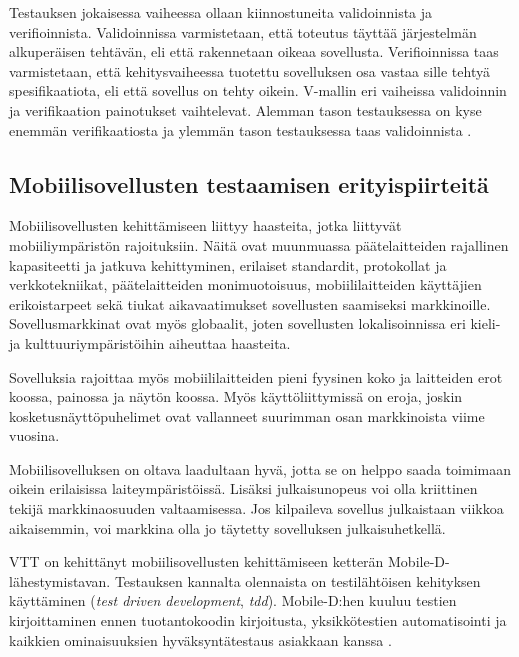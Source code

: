 Testauksen jokaisessa vaiheessa ollaan kiinnostuneita validoinnista ja verifioinnista. Validoinnissa varmistetaan, että toteutus täyttää järjestelmän alkuperäisen tehtävän, eli että rakennetaan oikeaa sovellusta. Verifioinnissa taas varmistetaan, että kehitysvaiheessa tuotettu sovelluksen osa vastaa sille tehtyä spesifikaatiota, eli että sovellus on tehty oikein. V-mallin eri vaiheissa validoinnin ja verifikaation painotukset vaihtelevat. Alemman tason testauksessa on kyse enemmän verifikaatiosta ja ylemmän tason testauksessa taas validoinnista \cite[41-42]{testing_foundations}.

\subsection{Mobiilisovellusten testaamisen erityispiirteitä}

Mobiilisovellusten kehittämiseen liittyy haasteita, jotka liittyvät mobiiliympäristön rajoituksiin. Näitä ovat muunmuassa päätelaitteiden rajallinen kapasiteetti ja jatkuva kehittyminen, erilaiset standardit, protokollat ja verkkotekniikat, päätelaitteiden monimuotoisuus, mobiililaitteiden käyttäjien erikoistarpeet sekä tiukat aikavaatimukset sovellusten saamiseksi markkinoille. Sovellusmarkkinat ovat myös globaalit, joten sovellusten lokalisoinnissa eri kieli- ja kulttuuriympäristöihin aiheuttaa haasteita.

Sovelluksia rajoittaa myös mobiililaitteiden pieni fyysinen koko ja laitteiden erot koossa, painossa ja näytön koossa. Myös käyttöliittymissä on eroja, joskin kosketusnäyttöpuhelimet ovat vallanneet suurimman osan markkinoista viime vuosina.

Mobiilisovelluksen on oltava laadultaan hyvä, jotta se on helppo saada toimimaan oikein erilaisissa laiteympäristöissä. Lisäksi julkaisunopeus voi olla kriittinen tekijä markkinaosuuden valtaamisessa. Jos kilpaileva sovellus julkaistaan viikkoa aikaisemmin, voi markkina olla jo täytetty sovelluksen julkaisuhetkellä.

VTT on kehittänyt mobiilisovellusten kehittämiseen ketterän Mobile-D-lähestymistavan. Testauksen kannalta olennaista on testilähtöisen kehityksen käyttäminen (\emph{test driven development}, \emph{tdd}). Mobile-D:hen kuuluu testien kirjoittaminen ennen tuotantokoodin kirjoitusta, yksikkötestien automatisointi ja kaikkien ominaisuuksien hyväksyntätestaus asiakkaan kanssa \cite{abrahamsson04}.

